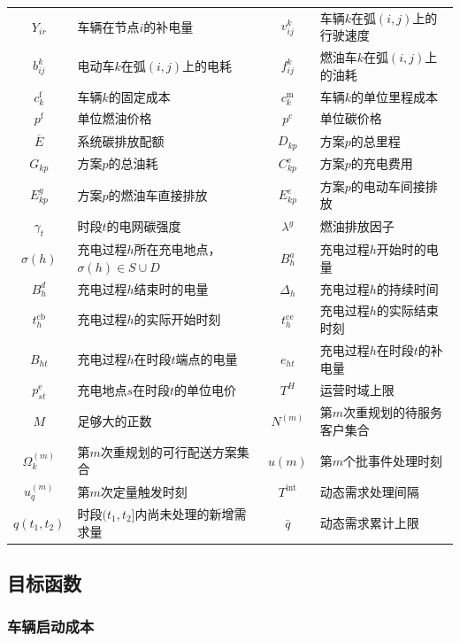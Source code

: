 \documentclass{setp-new}
\begin{document}
\begin{table}[H]
\begin{tabularx}{\linewidth}{@{}c>{\RaggedRight\arraybackslash}Xc>{\RaggedRight\arraybackslash}X@{}}
$Y_{ir}$ & 车辆在节点$i$的补电量 & $v_{ij}^{k}$ & 车辆$k$在弧$(i,j)$上的行驶速度\\
$b_{ij}^{k}$ & 电动车$k$在弧$(i,j)$上的电耗 & $f_{ij}^{k}$ & 燃油车$k$在弧$(i,j)$上的油耗\\
$c_k^{\mathrm f}$ & 车辆$k$的固定成本 & $c_k^{\mathrm m}$ & 车辆$k$的单位里程成本\\
$p^{\mathrm f}$ & 单位燃油价格 & $p^{\mathrm c}$ & 单位碳价格\\
$\overline E$ & 系统碳排放配额 & $D_{kp}$ & 方案$p$的总里程\\
$G_{kp}$ & 方案$p$的总油耗 & $C_{kp}^{\mathrm e}$ & 方案$p$的充电费用\\
$E_{kp}^{g}$ & 方案$p$的燃油车直接排放 & $E_{kp}^{e}$ & 方案$p$的电动车间接排放\\
$\gamma_t$ & 时段$t$的电网碳强度 & $\lambda^{g}$ & 燃油排放因子\\
$\sigma(h)$ & 充电过程$h$所在充电地点，$\sigma(h)\in S\cup D$ & $B_h^{a}$ & 充电过程$h$开始时的电量\\
$B_h^{d}$ & 充电过程$h$结束时的电量 & $\Delta_h$ & 充电过程$h$的持续时间\\
$t_h^{\mathrm{cb}}$ & 充电过程$h$的实际开始时刻 & $t_h^{\mathrm{ce}}$ & 充电过程$h$的实际结束时刻\\
$B_{ht}$ & 充电过程$h$在时段$t$端点的电量 & $e_{ht}$ & 充电过程$h$在时段$t$的补电量\\
$p_{st}^{\mathrm e}$ & 充电地点$s$在时段$t$的单位电价 & $T^{H}$ & 运营时域上限\\
$M$ & 足够大的正数 & $N^{(m)}$ & 第$m$次重规划的待服务客户集合\\
$\Omega_k^{(m)}$ & 第$m$次重规划的可行配送方案集合 & $u(m)$ & 第$m$个批事件处理时刻\\
$u_q^{(m)}$ & 第$m$次定量触发时刻 & $T^{\mathrm{int}}$ & 动态需求处理间隔\\
$q(t_1,t_2)$ & 时段$(t_1,t_2]$内尚未处理的新增需求量 & $\bar q$ & 动态需求累计上限\\
\bottomrule
\end{tabularx}
\end{table}

\subsection{目标函数}

\subsubsection{车辆启动成本}
\end{document}
